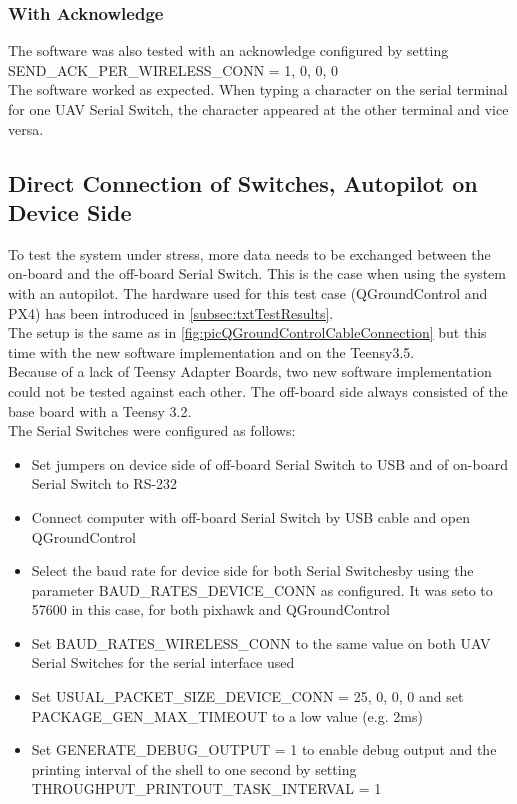 \subsubsection{With Acknowledge}
The software was also tested with an acknowledge configured by setting SEND\_ACK\_PER\_WIRELESS\_CONN = 1, 0, 0, 0\\
The software worked as expected. When typing a character on the serial terminal for one UAV Serial Switch, the character appeared at the other terminal and vice versa.
%
%
\subsection{Direct Connection of Switches, Autopilot on Device Side} \label{subsec:txtTestDirectConnQGroundControl}
To test the system under stress, more data needs to be exchanged between the on-board and the off-board Serial Switch. This is the case when using the system with an autopilot. The hardware used for this test case (QGroundControl and PX4) has been introduced in \autoref{subsec:txtTestResults}.\\
The setup is the same as in \autoref{fig:picQGroundControlCableConnection} but this time with the new software implementation and on the Teensy3.5.\\
Because of a lack of Teensy Adapter Boards, two new software implementation could not be tested against each other. The off-board side always consisted of the base board with a Teensy 3.2.\\
The Serial Switches were configured as follows:
\begin{itemize}
    \item Set jumpers on device side of off-board Serial Switch to USB and of on-board Serial Switch to RS-232
    \item Connect computer with off-board Serial Switch by USB cable and open QGroundControl
    \item Select the baud rate for device side for both Serial Switchesby using the parameter BAUD\_RATES\_DEVICE\_CONN as configured. It was seto to 57600 in this case, for both pixhawk and QGroundControl
    \item Set BAUD\_RATES\_WIRELESS\_CONN to the same value on both UAV Serial Switches for the serial interface used
    \item Set USUAL\_PACKET\_SIZE\_DEVICE\_CONN = 25, 0, 0, 0 and set PACKAGE\_GEN\_MAX\_TIMEOUT to a low value (e.g. 2ms)
    \item Set GENERATE\_DEBUG\_OUTPUT = 1 to enable debug output and the printing interval of the shell to one second by setting THROUGHPUT\_PRINTOUT\_TASK\_INTERVAL = 1
\end{itemize}
%
